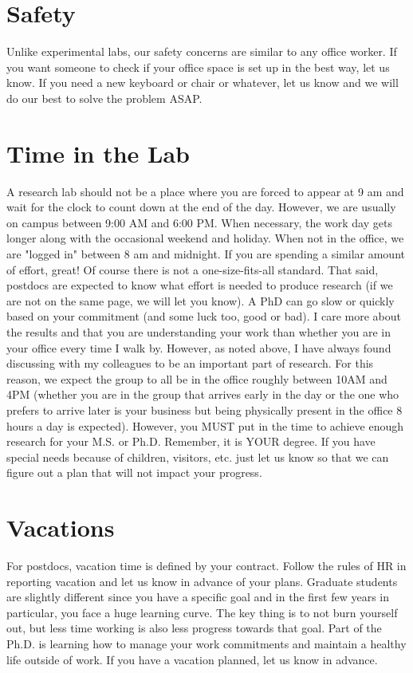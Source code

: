 \documentclass[letterpaper]{article}
\begin{document}
\section*{Safety}

Unlike experimental labs, our safety concerns are similar to any office worker. If you want someone to check if your office space is set up in the best way, let us know. If you need a new keyboard or chair or whatever, let us know and we will do our best to solve the problem ASAP.

\section*{Time in the Lab}
A research lab should not be a place where you are forced to appear at 9 am and wait for the clock to count down at the end of the day. However, we are usually on campus between 9:00 AM and 6:00 PM. When necessary, the work day gets longer along with the occasional weekend and holiday. When not in the office, we are "logged in" between 8 am and midnight. If you are spending a similar amount of effort, great! Of course there is not a one-size-fits-all standard. That said, postdocs are expected to know what effort is needed to produce research (if we are not on the same page, we will let you know). A PhD can go slow or quickly based on your commitment (and some luck too, good or bad). I care more about the results and that you are understanding your work than whether you are in your office every time I walk by. However, as noted above, I have always found discussing with my colleagues to be an important part of research. For this reason, we expect the group to all be in the office roughly between 10AM and 4PM (whether you are in the group that arrives early in the day or the one who prefers to arrive later is your business but being physically present in the office 8 hours a day is expected). However, you MUST put in the time to achieve enough research for your M.S. or Ph.D. Remember, it is YOUR degree. If you have special needs because of children, visitors, etc. just let us know so that we can figure out a plan that will not impact your progress.

\section*{Vacations}
For postdocs, vacation time is defined by your contract. Follow the rules of HR in reporting vacation and let us know in advance of your plans. Graduate students are slightly different since you have a specific goal and in the first few years in particular, you face a huge learning curve. The key thing is to not burn yourself out, but less time working is also less progress towards that goal. Part of the Ph.D. is learning how to manage your work commitments and maintain a healthy life outside of work. If you have a vacation planned, let us know in advance. 
\end{document}
